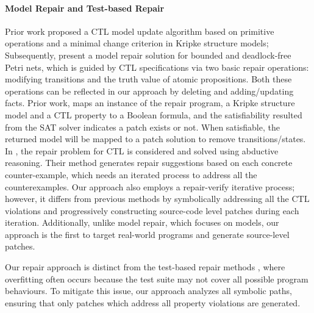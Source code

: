 \paragraph*{\textbf{Model Repair and Test-based Repair}}
Prior work \cite{DBLP:conf/ecai/DingZ06} proposed a CTL model update algorithm based on primitive operations and a minimal change criterion in Kripke structure models;  
Subsequently, 
\cite{martinez2015ctl} present a  model repair solution for bounded and deadlock-free Petri nets, which  
is guided by CTL specifications via two basic repair operations: modifying transitions and the truth value of atomic propositions. Both these operations can be reflected in our approach by deleting and adding/updating facts. 
Prior work, \cite{DBLP:conf/memocode/AttieCBSS15} maps an instance of the repair program, \ie a Kripke structure model and a CTL property to a Boolean formula, and the satisfiability resulted from the SAT solver indicates a patch exists or not. When satisfiable, the returned model will be mapped to a patch solution to remove transitions/states. 
In \cite{DBLP:journals/ai/BuccafurriEGL99}, the repair problem for CTL is considered and solved using abductive reasoning. 
Their method generates repair suggestions based on each concrete counter-example, which needs an iterated process to address all the counterexamples. 
Our approach also employs a repair-verify iterative process; however, it differs from previous methods by symbolically addressing all the CTL violations and progressively constructing source-code level patches during each iteration. 
Additionally, unlike model repair, which focuses on models, our approach is the first to target real-world programs and generate source-level patches. 


Our repair approach is distinct from the test-based repair methods  \cite{DBLP:journals/cacm/GouesPR19}, where overfitting often occurs because the test suite may not cover all possible program behaviours. To mitigate this issue, our approach analyzes all symbolic paths, ensuring that only patches which address all property violations are generated.



